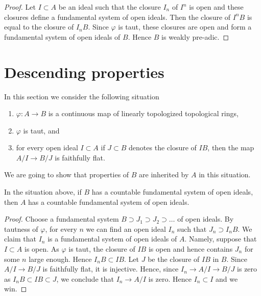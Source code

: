 \begin{proof}
Let $I \subset A$ be an ideal such that the closure $I_n$ of $I^n$
is open and these closures define a fundamental system of open ideals.
Then the closure of $I^nB$ is equal to the closure of $I_nB$.
Since $\varphi$ is taut, these closures are open and form a fundamental
system of open ideals of $B$. Hence $B$ is weakly pre-adic.
\end{proof}







\section{Descending properties}
\label{section-taut-descent}

\noindent
In this section we consider the following situation
\begin{enumerate}
\item $\varphi : A \to B$ is a continuous map of
linearly topologized topological rings,
\item $\varphi$ is taut, and
\item for every open ideal $I \subset A$ if $J \subset B$
denotes the closure of $IB$, then the map $A/I \to B/J$
is faithfully flat.
\end{enumerate}
We are going to show that properties of $B$ are inherited
by $A$ in this situation.

\begin{lemma}
\label{lemma-taut-descent-countable}
In the situation above, if $B$ has a countable fundamental system of
open ideals, then $A$ has a countable fundamental system of open ideals.
\end{lemma}

\begin{proof}
Choose a fundamental system $B \supset J_1 \supset J_2 \supset \ldots$
of open ideals. By tautness of $\varphi$, for every $n$ we can find an
open ideal $I_n$ such that $J_n \supset I_nB$. We claim that
$I_n$ is a fundamental system of open ideals of $A$.
Namely, suppose that $I \subset A$ is open. As $\varphi$ is taut,
the closure of $IB$ is open and hence contains $J_n$ for some $n$
large enough. Hence $I_nB \subset IB$. Let $J$ be the closure of
$IB$ in $B$. Since $A/I \to B/J$ is faithfully flat, it is injective.
Hence, since $I_n \to A/I \to B/J$ is zero as $I_nB \subset IB \subset J$,
we conclude that $I_n \to A/I$ is zero. Hence $I_n \subset I$ and
we win.
\end{proof}

